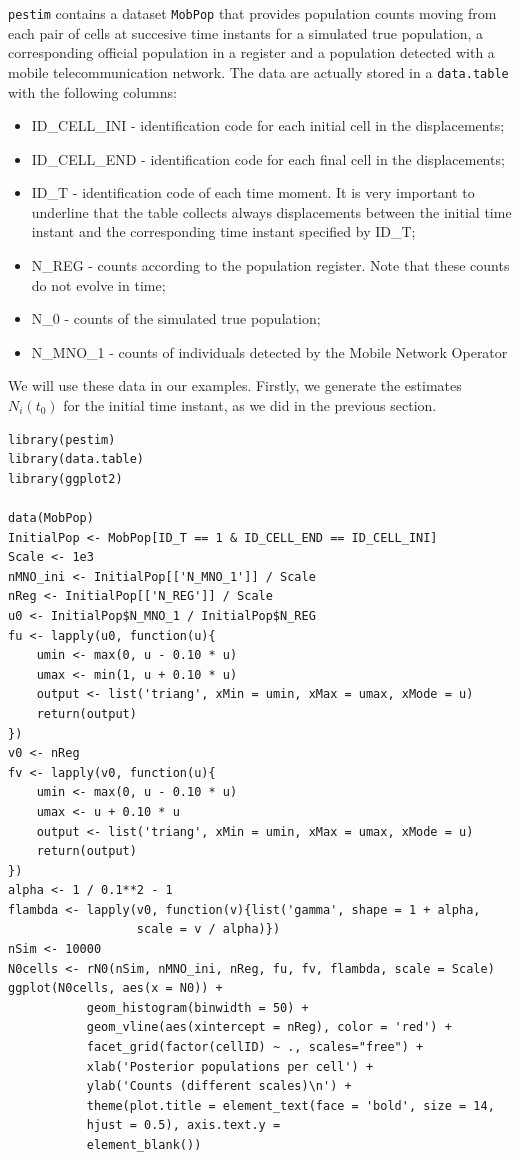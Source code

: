 \documentclass[12pt, a4paper]{article}
\begin{document}
\texttt{pestim} contains a dataset \texttt{MobPop} that provides population counts moving from 
each pair of cells at succesive time instants for a simulated true population, a corresponding official
population in a register and a population detected with a mobile telecommunication network. The data
are actually stored in a \texttt{data.table} with the following columns:
\begin{itemize}
\item ID\_CELL\_INI - identification code for each initial cell in the displacements;
\item ID\_CELL\_END - identification code for each final cell in the displacements;
\item ID\_T - identification code of each time moment. It is very important to underline that the 
table collects always displacements between the initial time instant and the corresponding time instant specified by ID\_T;
\item N\_REG - counts according to the population register. Note that these counts do not evolve in time;
\item N\_0 - counts of the simulated true population;
\item N\_MNO\_1 - counts of individuals detected by the Mobile Network Operator
\end{itemize}

We will use these data in our examples. Firstly, we generate the estimates $N_{i}(t_{0})$ for the 
initial time instant, as we  did in the previous section.

\begin{verbatim}
library(pestim)
library(data.table)
library(ggplot2)

data(MobPop)
InitialPop <- MobPop[ID_T == 1 & ID_CELL_END == ID_CELL_INI]
Scale <- 1e3
nMNO_ini <- InitialPop[['N_MNO_1']] / Scale
nReg <- InitialPop[['N_REG']] / Scale
u0 <- InitialPop$N_MNO_1 / InitialPop$N_REG
fu <- lapply(u0, function(u){
    umin <- max(0, u - 0.10 * u)
    umax <- min(1, u + 0.10 * u)
    output <- list('triang', xMin = umin, xMax = umax, xMode = u)
    return(output)
})
v0 <- nReg
fv <- lapply(v0, function(u){
    umin <- max(0, u - 0.10 * u)
    umax <- u + 0.10 * u
    output <- list('triang', xMin = umin, xMax = umax, xMode = u)
    return(output)
})
alpha <- 1 / 0.1**2 - 1
flambda <- lapply(v0, function(v){list('gamma', shape = 1 + alpha, 
                  scale = v / alpha)})
nSim <- 10000
N0cells <- rN0(nSim, nMNO_ini, nReg, fu, fv, flambda, scale = Scale)
ggplot(N0cells, aes(x = N0)) + 
           geom_histogram(binwidth = 50) +
           geom_vline(aes(xintercept = nReg), color = 'red') +
           facet_grid(factor(cellID) ~ ., scales="free") +
           xlab('Posterior populations per cell') + 
           ylab('Counts (different scales)\n') +
           theme(plot.title = element_text(face = 'bold', size = 14, 
           hjust = 0.5), axis.text.y =
           element_blank())
\end{verbatim}
\end{document}
